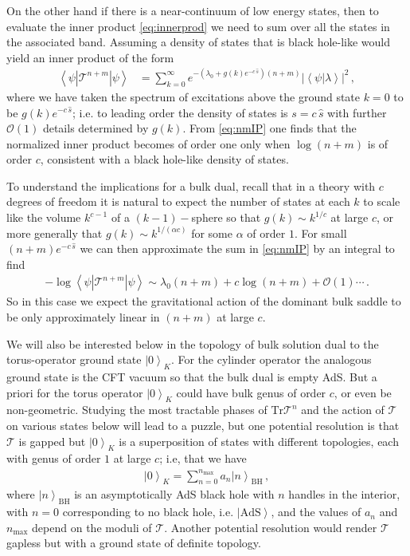 \documentclass[letterpaper,12pt]{article}
\newcommand{\ban}[1]{\begin{align}#1\end{align}}
\newcommand{\corr}[1]{\left< #1\right>}
\newcommand{\ket}[1]{\left| #1\right>}
\begin{document}
On the other hand if there is a near-continuum of low energy states, then to evaluate the inner product \eqref{eq:innerprod} we need to sum over all the states in the associated band. Assuming a density of states that is black hole-like would yield an inner product of the form
\ban{
\label{eq:nmIP}
\corr {\psi| \mathcal T^{n+m} |\psi} &= \sum_{k=0}^\infty e^{-( \lambda_0 + g(k)e^{-c\, \hat s} )(n+m)} |\corr{\psi|\lambda}|^2\, ,
}
where we have taken the spectrum of excitations above the ground state $k=0$ to be $g(k) e^{-c\, \hat s}$; i.e. to leading order the density of states is $s= c \, \hat s$ with further $\mathcal O(1)$ details determined by $g(k)$.   From \eqref{eq:nmIP} one finds that the normalized inner product becomes of order one only when $\log(n+m)$ is of order $c$, consistent with a black hole-like density of states.

To understand the implications for a bulk dual, recall that in a theory with $c$ degrees of freedom it is natural to expect the number of states at each $k$ to scale like the volume $k^{c-1}$ of a $(k-1)-$sphere so that $g(k)\sim k^{1/c}$ at large $c$, or more generally that $g(k)\sim k^{1/(\alpha c)}$ for some $\alpha$ of order $1$. For small $(n+m)e^{-c \,\hat s}$ we can then approximate the sum in \eqref{eq:nmIP} by an integral to find
\ban{
-\log {\corr {\psi| \mathcal T^{n+m} |\psi} }\sim    \lambda_0(n+m) + c \log(n+m) + \mathcal O(1) \cdots  \, .
}
So in this case we expect the gravitational action of the dominant bulk saddle to  be only approximately linear in $(n+m)$ at large $c$.

We will also be interested below in the topology of bulk solution dual to the torus-operator ground state $\ket 0_K$. For the cylinder operator the analogous ground state is the CFT vacuum so that the bulk dual is empty AdS.  But a priori for the torus operator $\ket 0_K$ could have bulk genus of order $c$, or even be non-geometric.   Studying the most tractable phases of $\text{Tr} {\mathcal T}^n$ and the action of $\mathcal T$ on various states below will lead to a puzzle, but one potential resolution is that $\mathcal T$ is gapped but $\ket 0_K$ is a superposition of states with different topologies, each with genus of order $1$ at large $c$; i.e, that we have
\ban{
\ket 0_K = \sum_{n=0}^{n_\text{max}} a_n \ket {n}_\text{BH}\, ,\label{eq:gs}
}
where $\ket{n}_\text{BH}$ is an asymptotically AdS black hole with $n$ handles in the interior, with $n=0$ corresponding to no black hole, i.e. $\ket{\text{AdS}}$, and the values of $a_n$ and $n_\text{max}$ depend on the moduli of $\mathcal T$. Another potential resolution would render $\mathcal T$ gapless but with a ground state of definite topology.
\end{document}
